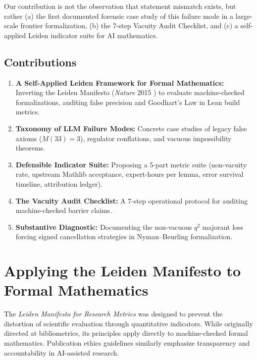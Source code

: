 \documentclass[11pt,a4paper]{article}
\theoremstyle{definition}
\theoremstyle{remark}
\begin{document}
Our contribution is not the observation that statement mismatch exists, but rather (a) the first documented forensic case study of this failure mode in a large-scale frontier formalization, (b) the 7-step Vacuity Audit Checklist, and (c) a self-applied Leiden indicator suite for AI mathematics.

\subsection{Contributions}

\begin{enumerate}[label=\textbf{\arabic*.}]
  \item \textbf{A Self-Applied Leiden Framework for Formal Mathematics:} Inverting the Leiden Manifesto (\emph{Nature} 2015 \cite{Hicks2015}) to evaluate machine-checked formalizations, auditing false precision and Goodhart's Law in Lean build metrics.
  \item \textbf{Taxonomy of LLM Failure Modes:} Concrete case studies of legacy false axioms ($M(33)=3$), regulator conflations, and vacuous impossibility theorems.
  \item \textbf{Defensible Indicator Suite:} Proposing a 5-part metric suite (non-vacuity rate, upstream Mathlib acceptance, expert-hours per lemma, error survival timeline, attribution ledger).
  \item \textbf{The Vacuity Audit Checklist:} A 7-step operational protocol for auditing machine-checked barrier claims.
  \item \textbf{Substantive Diagnostic:} Documenting the non-vacuous $q^2$ majorant loss forcing signed cancellation strategies in Nyman--Beurling formalization.
\end{enumerate}

\section{Applying the Leiden Manifesto to Formal Mathematics}
\label{sec:leiden}

The \emph{Leiden Manifesto for Research Metrics} \cite{Hicks2015} was designed to prevent the distortion of scientific evaluation through quantitative indicators. While originally directed at bibliometrics, its principles apply directly to machine-checked formal mathematics. Publication ethics guidelines \cite{COPE2023} similarly emphasize transparency and accountability in AI-assisted research.
\end{document}

